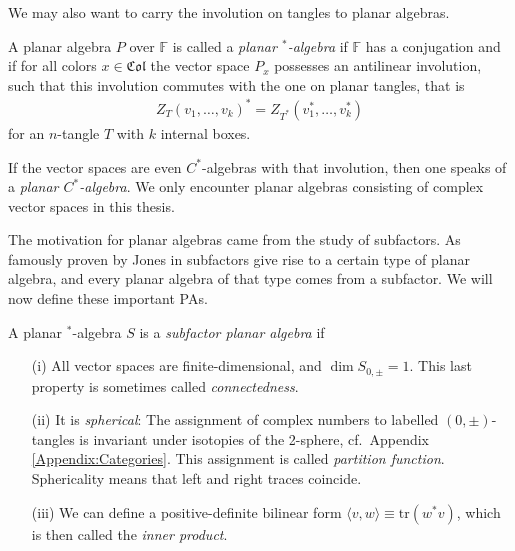 \bigno
We may also want to carry the involution on tangles to planar algebras.
\begin{definition}
A planar algebra $P$ over $\mathbb{F}$ is called a \emph{planar ${}^*$-algebra} if $\mathbb{F}$ has a conjugation and if for all colors $x\in\mathfrak{Col}$ the vector space $P_x$ possesses an antilinear involution, such that this involution commutes with the one on planar tangles, that is
\begin{align*}
Z_T(v_1, \ldots, v_k)^* = Z_{T^*}(v_1^*,\ldots, v_k^*)
\end{align*}
for an $n$-tangle $T$ with $k$ internal boxes.
\end{definition}
If the vector spaces are even $C^*$-algebras with that involution, then one speaks of a \emph{planar $C^*$-algebra}.  We only encounter planar algebras consisting of complex vector spaces in this thesis.

The motivation for planar algebras came from the study of subfactors. As famously proven by Jones in \cite[Chapter 4]{jones1999planar1} subfactors give rise to a certain type of planar algebra, and every planar algebra of that type comes from a subfactor. We will now define these important PAs. 
\begin{definition}
A planar ${}^*$-algebra $S$ is a \emph{subfactor planar algebra} if
\begin{itemize}
\item[\textsf{(i)}] All vector spaces are finite-dimensional, and $\dim S_{0,\pm}=1$. This last property is sometimes called \emph{connectedness}.
\item[\textsf{(ii)}] It is \emph{spherical}: The assignment of complex numbers to labelled\footnotemark{}
 $(0,\pm)$-tangles is invariant under isotopies of the 2-sphere, cf.\ \textsf{Appendix \ref{Appendix:Categories}}. This assignment is called \emph{partition function}. Sphericality means that left and right traces coincide.
\item[\textsf{(iii)}]We can define a positive-definite bilinear form $\langle v,w \rangle\equiv \mathrm{tr}(w^* v)$, which is then called the \emph{inner product}.
\end{itemize}
\end{definition}

